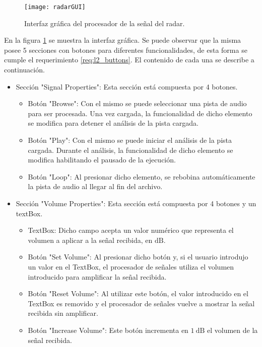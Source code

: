 \begin{figure}[htb]
 \centering
 \texttt{[image: radarGUI]}
 \caption{Interfaz gráfica del procesador de la señal del radar.}
 \label{fig:radarSnapshot}
\end{figure}
En la figura \ref{fig:radarSnapshot} se muestra la interfaz gráfica. Se puede observar que la misma posee 5 secciones con botones para diferentes funcionalidades, de esta forma se cumple el requerimiento \ref{req:l2_buttons}. El contenido de cada una se describe a continuación.
\begin{itemize}
  \item Sección "Signal Properties": Esta sección está compuesta por 4 botones.
  \begin{itemize}
    \item Botón "Browse": Con el mismo se puede seleccionar una pista de audio para ser procesada. Una vez cargada, la funcionalidad de dicho elemento se modifica para detener el análisis de la pista cargada.

    \item Botón "Play": Con el mismo se puede iniciar el análisis de la pista cargada. Durante el análisis, la funcionalidad de dicho elemento se modifica habilitando el pausado de la ejecución.

    \item Botón "Loop": Al presionar dicho elemento, se rebobina automáticamente la pista de audio al llegar al fin del archivo.
  \end{itemize}

  \item Sección "Volume Properties": Esta sección está compuesta por 4 botones y un textBox.
  \begin{itemize}
    \item TextBox: Dicho campo acepta un valor numérico que representa el volumen a aplicar a la señal recibida, en $\si{\dB}$.

    \item Botón "Set Volume": Al presionar dicho botón y, si el usuario introdujo un valor en el TextBox, el procesador de señales utiliza el volumen introducido para amplificar la señal recibida.

    \item Botón "Reset Volume": Al utilizar este botón, el valor introducido en el TextBox es removido y el procesador de señales vuelve a mostrar la señal recibida sin amplificar.

    \item Botón "Increase Volume": Este botón incrementa en $\SI{1}{\dB}$ el volumen de la señal recibida.


\end{itemize}
\end{itemize}
